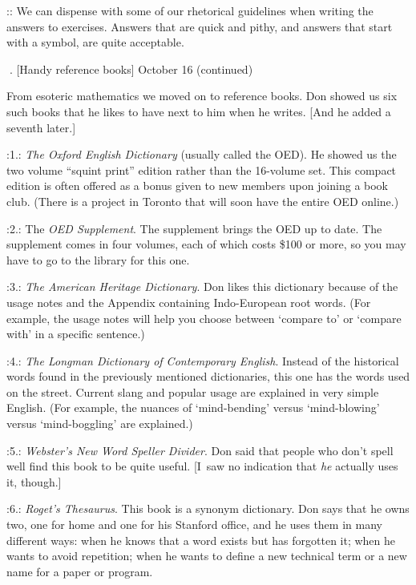 \smallskip
\display 30pt::
    We can dispense with some of our rhetorical guidelines when writing the
    answers to exercises.  Answers that are quick and pithy,
and answers that start
    with a symbol, are quite acceptable.

. [Handy reference books] \tll October {16 (continued)}

From esoteric mathematics we moved on to reference books.  Don showed us
six such books that he likes to have next to him when he writes.
[And he added a seventh later.]

\smallskip
\display 30pt:1.:
{\sl       The Oxford English Dictionary\/} (usually called the OED). 
	He showed us the two volume ``squint print'' edition rather than
	the 16-volume set.  This compact edition is often offered as a bonus
	given to new members upon joining a book club.  (There is 
	a project in Toronto that will soon have the entire OED 
	online.)

\smallskip
\display 30pt:2.:
           The {\sl OED Supplement}.  The supplement brings the OED up to date.
 	The supplement comes in four volumes, each of which costs \$100 
or more, so you
           may have to go to the library for this one.

\smallskip
\display 30pt:3.:
           {\sl The American Heritage Dictionary}.  Don likes this dictionary 
	because of the usage notes and the Appendix containing
	Indo-European root words.  (For example, the usage notes will
	help you choose between `compare to' or `compare with' in 
	a specific sentence.)
	
\smallskip
\display 30pt:4.:
          {\sl The Longman Dictionary of Contemporary English}.  Instead of the
	historical words found in the previously mentioned dictionaries, 
	this one has the words used on the street.  Current slang and
	popular usage are explained in very simple English.  (For example,
	the nuances of `mind-bending' versus `mind-blowing' versus 
	`mind-boggling' are explained.)
	
\smallskip
\display 30pt:5.:
	{\sl Webster's New Word Speller Divider}.  Don said that people who
	don't spell well find this book to be quite useful.  [I~saw no
	indication that {\sl he\/} actually uses it, though.]
	
\smallskip
\display 30pt:6.:
	{\sl Roget's Thesaurus}. This book is a synonym dictionary.  Don says
	that he owns two, 
one for home and one for his Stanford office, and he
 uses them in many different ways: when he
	knows that a word exists but has forgotten it; when he wants to 
	avoid repetition;  when he wants to define a new 
technical term or a new name for a 	paper or program.
	
